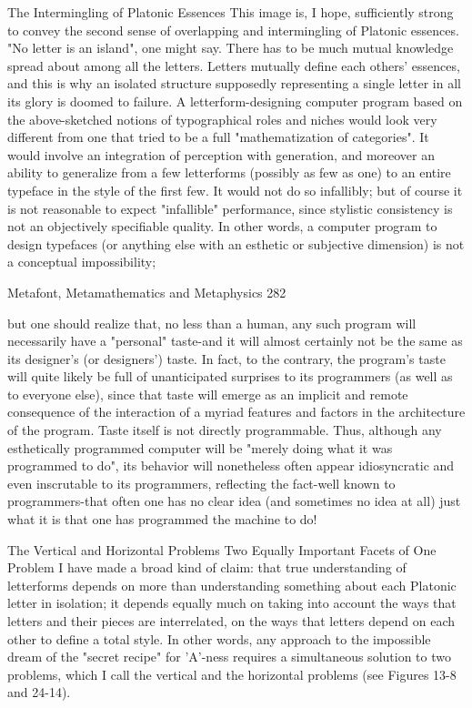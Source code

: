                        The Intermingling of Platonic Essences
        This image is, I hope, sufficiently strong to convey the second sense of
overlapping and intermingling of Platonic essences. "No letter is an island", one might
say. There has to be much mutual knowledge spread about among all the letters. Letters
mutually define each others' essences, and this is why an isolated structure supposedly
representing a single letter in all its glory is doomed to failure.
        A letterform-designing computer program based on the above-sketched notions of
typographical roles and niches would look very different from one that tried to be a full
"mathematization of categories". It would involve an integration of perception with
generation, and moreover an ability to generalize from a few letterforms (possibly as few
as one) to an entire typeface in the style of the first few. It would not do so infallibly; but
of course it is not reasonable to expect "infallible" performance, since stylistic
consistency is not an objectively specifiable quality.
        In other words, a computer program to design typefaces (or anything else with an
esthetic or subjective dimension) is not a conceptual impossibility;




Metafont, Metamathematics and Metaphysics                                                 282

but one should realize that, no less than a human, any such program will necessarily have
a "personal" taste-and it will almost certainly not be the same as its designer's (or
designers') taste. In fact, to the contrary, the program's taste will quite likely be full of
unanticipated surprises to its programmers (as well as to everyone else), since that taste
will emerge as an implicit and remote consequence of the interaction of a myriad features
and factors in the architecture of the program. Taste itself is not directly programmable.
Thus, although any esthetically programmed computer will be "merely doing what it was
programmed to do", its behavior will nonetheless often appear idiosyncratic and even
inscrutable to its programmers, reflecting the fact-well known to programmers-that often
one has no clear idea (and sometimes no idea at all) just what it is that one has
programmed the machine to do!

                   The Vertical and Horizontal Problems
                Two Equally Important Facets of One Problem
       I have made a broad kind of claim: that true understanding of letterforms depends
on more than understanding something about each Platonic letter in isolation; it depends
equally much on taking into account the ways that letters and their pieces are interrelated,
on the ways that letters depend on each other to define a total style. In other words, any
approach to the impossible dream of the "secret recipe" for 'A'-ness requires a
simultaneous solution to two problems, which I call the vertical and the horizontal
problems (see Figures 13-8 and 24-14).

